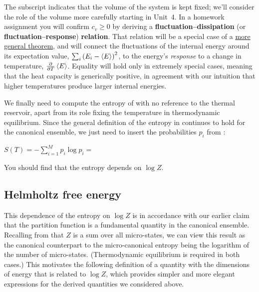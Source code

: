The subscript indicates that the volume of the system is kept fixed; we'll consider the role of the volume more carefully starting in Unit~4.
In a homework assignment you will confirm $c_v \geq 0$ by deriving a \textbf{fluctuation--dissipation} (or \textbf{fluctuation--response}) \textbf{relation}.
That relation will be a special case of a \href{https://en.wikipedia.org/wiki/Fluctuation-dissipation_theorem}{more general theorem}, and will connect the fluctuations of the internal energy around its expectation value, $\sum_i \left(E_i - \left\langle E \right\rangle\right)^2$, to the energy's \textit{response} to a change in temperature, $\frac{\partial }{\partial T} \left\langle E \right\rangle$.
Equality will hold only in extremely special cases, meaning that the heat capacity is generically positive, in agreement with our intuition that higher temperatures produce larger internal energies.

\newpage %
We finally need to compute the entropy of \Om with no reference to the thermal reservoir, apart from its role fixing the temperature in thermodynamic equilibrium.
Since the general definition of the entropy in  continues to hold for the canonical ensemble, we just need to insert the probabilities $p_i$ from :
\begin{mdframed}
  $\displaystyle S(T) = -\sum_{i = 1}^M p_i \log p_i = $ \\[100 pt]
\end{mdframed}
You should find that the entropy depends on $\log Z$.



\subsection{\label{sec:Helmholtz}Helmholtz free energy}
This dependence of the entropy on $\log Z$ is in accordance with our earlier claim that the partition function is a fundamental quantity in the canonical ensemble.
Recalling from  that $Z$ is a sum over all micro-states, we can view this result as the canonical counterpart to the micro-canonical entropy being the logarithm of the number of micro-states.
(Thermodynamic equilibrium is required in both cases.)
This motivates the following definition of a quantity with the dimensions of energy that is related to $\log Z$, which provides simpler and more elegant expressions for the derived quantities we considered above.

